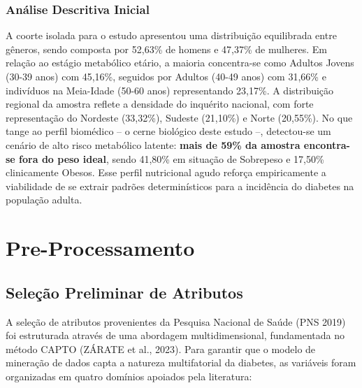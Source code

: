 \documentclass[12pt, a4paper]{article}
\begin{document}
    \subsubsection{Análise Descritiva Inicial}
        A coorte isolada para o estudo apresentou uma distribuição equilibrada entre gêneros, sendo composta por 52,63\% de homens e 47,37\% de mulheres. Em relação ao estágio metabólico etário, a maioria concentra-se como Adultos Jovens (30-39 anos) com 45,16\%, seguidos por Adultos (40-49 anos) com 31,66\% e indivíduos na Meia-Idade (50-60 anos) representando 23,17\%. A distribuição regional da amostra reflete a densidade do inquérito nacional, com forte representação do Nordeste (33,32\%), Sudeste (21,10\%) e Norte (20,55\%). No que tange ao perfil biomédico – o cerne biológico deste estudo –, detectou-se um cenário de alto risco metabólico latente: \textbf{mais de 59\% da amostra encontra-se fora do peso ideal}, sendo 41,80\% em situação de Sobrepeso e 17,50\% clinicamente Obesos. Esse perfil nutricional agudo reforça empiricamente a viabilidade de se extrair padrões determinísticos para a incidência do diabetes na população adulta.

     \newpage
        
    \section {Pre-Processamento}

    \subsection{Seleção Preliminar de Atributos}


    A seleção de atributos provenientes da Pesquisa Nacional de Saúde (PNS 2019) foi estruturada através de uma abordagem multidimensional, fundamentada no método CAPTO (ZÁRATE et al., 2023). Para garantir que o modelo de mineração de dados capta a natureza multifatorial da diabetes, as variáveis foram organizadas em quatro domínios apoiados pela literatura:
\end{document}
